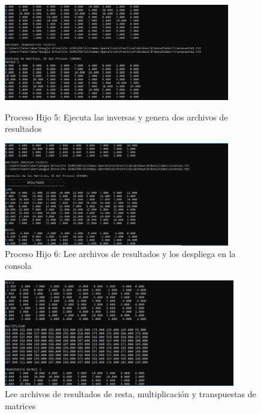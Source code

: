 \documentclass[12pt]{article}
\begin{document}
\begin{itemize}
\begin{itemize}
\begin{figure}[h!]
                        \includegraphics[width=0.88\textwidth]{Practica4/Images/Windows/8_4.PNG}
                        \caption{Proceso Hijo 5: Ejecuta las inversas y genera dos archivos de resultados}
                        
                        \includegraphics[width=0.88\textwidth]{Practica4/Images/Windows/8_5.PNG}
                        \caption{Proceso Hijo 6: Lee archivos de resultados y los despliega en la consola}
                        
                    \end{figure}
                    
                    \newpage
                    \begin{figure}[h!]
                        \centering
                        
                        
                        \includegraphics[width=0.9\textwidth]{Practica4/Images/Windows/8_6.PNG}
                        \caption{Lee archivos de resultados de resta, multiplicación y transpuestas de matrices}
                        

\end{figure}
\end{itemize}
\end{itemize}
\end{document}
